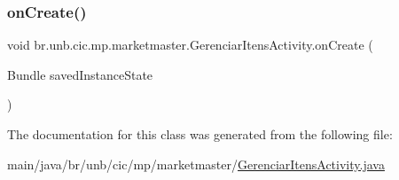 \subsubsection{\texorpdfstring{on\+Create()}{onCreate()}}
{\footnotesize\ttfamily void br.\+unb.\+cic.\+mp.\+marketmaster.\+Gerenciar\+Itens\+Activity.\+on\+Create (\begin{DoxyParamCaption}\item[{Bundle}]{saved\+Instance\+State }\end{DoxyParamCaption})\hspace{0.3cm}{\ttfamily [protected]}}



The documentation for this class was generated from the following file\+:\begin{DoxyCompactItemize}
\item 
main/java/br/unb/cic/mp/marketmaster/\mbox{\hyperlink{GerenciarItensActivity_8java}{Gerenciar\+Itens\+Activity.\+java}}\end{DoxyCompactItemize}
